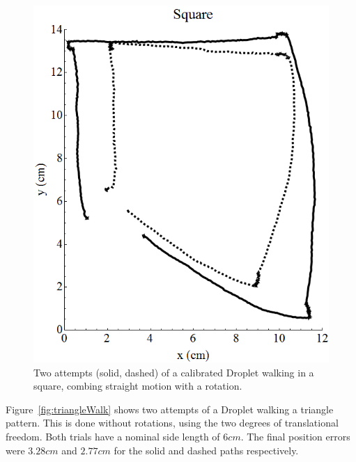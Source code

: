 \documentclass[letterpaper, 10pt, conference]{ieeeconf}
\begin{document}
\begin{figure}[!htb]
\centering
\includegraphics[width=0.9\linewidth]{Images/DropletWalksSquare}
\caption{Two attempts (solid, dashed) of a calibrated Droplet walking in a square, combing straight motion with a rotation.}
\label{fig:squareWalk}
\end{figure}

Figure~\ref{fig:triangleWalk} shows two attempts of a Droplet walking a triangle pattern. This is done without rotations, using the two degrees of translational freedom. Both trials have a nominal side length of $6cm$. The final position errors were $3.28cm$ and $2.77cm$ for the solid and dashed paths respectively.
\end{document}
